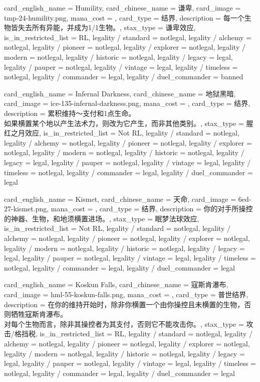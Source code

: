 \documentclass[lang = cn, color = black, 10pt]{AllThatStax}
\begin{document}
\card
{
	card_english_name = {Humility},
	card_chinese_name = {谦卑},
	card_image = tmp-24-humility.png,
	mana_cost = ,
	card_type = 结界,
	description = {每一个生物皆失去所有异能，并成为1/1生物。},
	stax_type = 谦卑效应,
	is_in_restricted_list = RL,
	legality / standard = notlegal,
	legality / alchemy = notlegal,
	legality / pioneer = notlegal,
	legality / explorer = notlegal,
	legality / modern = notlegal,
	legality / historic = notlegal,
	legality / legacy = legal,
	legality / pauper = notlegal,
	legality / vintage = legal,
	legality / timeless = notlegal,
	legality / commander = legal,
	legality / duel_commander = banned
}

\card
{
	card_english_name = {Infernal Darkness},
	card_chinese_name = {地狱黑暗},
	card_image = ice-135-infernal-darkness.png,
	mana_cost = ,
	card_type = 结界,
	description = {累积维持～支付和1点生命。\\
如果横置某个地以产生法术力，则改为它产生，而非其他类别。},
	stax_type = 腥红之月效应,
	is_in_restricted_list = Not RL,
	legality / standard = notlegal,
	legality / alchemy = notlegal,
	legality / pioneer = notlegal,
	legality / explorer = notlegal,
	legality / modern = notlegal,
	legality / historic = notlegal,
	legality / legacy = legal,
	legality / pauper = notlegal,
	legality / vintage = legal,
	legality / timeless = notlegal,
	legality / commander = legal,
	legality / duel_commander = legal
}

\card
{
	card_english_name = {Kismet},
	card_chinese_name = {天命},
	card_image = 6ed-27-kismet.png,
	mana_cost = ,
	card_type = 结界,
	description = {你的对手所操控的神器、生物，和地须横置进场。},
	stax_type = 眠梦法球效应,
	is_in_restricted_list = Not RL,
	legality / standard = notlegal,
	legality / alchemy = notlegal,
	legality / pioneer = notlegal,
	legality / explorer = notlegal,
	legality / modern = notlegal,
	legality / historic = notlegal,
	legality / legacy = legal,
	legality / pauper = notlegal,
	legality / vintage = legal,
	legality / timeless = notlegal,
	legality / commander = legal,
	legality / duel_commander = legal
}

\card
{
	card_english_name = {Koskun Falls},
	card_chinese_name = {寇斯肯瀑布},
	card_image = hml-55-koskun-falls.png,
	mana_cost = ,
	card_type = 普世结界,
	description = {在你的维持开始时，除非你横置一个由你操控且未横置的生物，否则牺牲寇斯肯瀑布。\\
对每个生物而言，除非其操控者为其支付，否则它不能攻击你。},
	stax_type = 攻击/格挡税,
	is_in_restricted_list = RL,
	legality / standard = notlegal,
	legality / alchemy = notlegal,
	legality / pioneer = notlegal,
	legality / explorer = notlegal,
	legality / modern = notlegal,
	legality / historic = notlegal,
	legality / legacy = legal,
	legality / pauper = notlegal,
	legality / vintage = legal,
	legality / timeless = notlegal,
	legality / commander = legal,
	legality / duel_commander = legal
}
\end{document}
